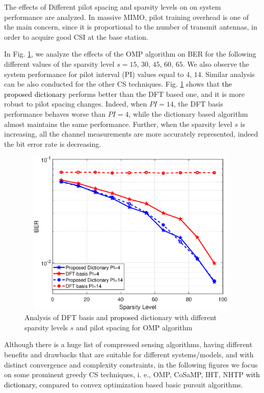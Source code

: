 The effects of Different pilot spacing and sparsity levels on on system performance are analyzed. In massive MIMO, pilot training overhead is one of the main concern, since it is proportional to the number of transmit antennas, in order to acquire good CSI at the base station. 

In Fig. \ref{Fig_result1}, we analyze the effects of the OMP algorithm on BER for the following different values of the sparsity level $s= 15$, $30$, $45$, $60$, $65$. We also observe the system performance for pilot interval (PI) values equal to $4$, $14$. Similar analysis can be also conducted for the other CS techniques.
Fig. \ref{Fig_result1} shows that \textcolor{black}{the proposed dictionary} performs better than the DFT based one, and it is more robust to pilot spacing changes. Indeed, when $PI=14$, the DFT basis performance behaves worse than $PI=4$, while the dictionary based algorithm almost maintains the same performance. 
Further, when the sparsity level $s$ is increasing, all the channel measurements are more accurately represented, indeed the bit error rate is decreasing.

\begin{figure}
	\centering
	\includegraphics[width=110mm,height=80mm]{figures/figchap4/sparsity.eps}
	\caption{Analysis of DFT basis and \textcolor{black}{proposed} dictionary with different sparsity levels $s$ and pilot spacing for OMP algorithm}	
	\label{Fig_result1}
\end{figure}


Although there is a huge list of compressed sensing algorithms, having different benefits and drawbacks that are suitable for different systems/models, and with distinct convergence and complexity constraints, in the following figures we focus on some prominent greedy CS techniques, i. e., OMP, CoSaMP, IHT, NHTP \textcolor{black}{with dictionary,} compared to convex optimization based basic pursuit algorithms.

